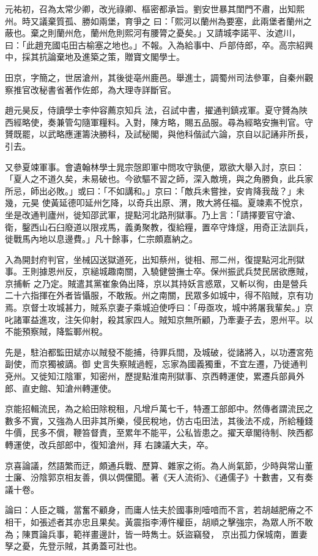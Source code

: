 \begin{pinyinscope}
 元祐初，召為太常少卿，改光祿卿、樞密都承旨。劉安世暴其閨門不肅，出知熙州。時又議棄質孤、勝如兩堡，育爭之
 曰：「熙河以蘭州為要塞，此兩堡者蘭州之蔽也。棄之則蘭州危，蘭州危則熙河有腰膂之憂矣。」又請城李諾平、汝遮川，曰：「此趙充國屯田古榆塞之地也。」不報。入為給事中、戶部侍郎，卒。高宗紹興中，採其抗論棄地及進築之策，贈寶文閣學士。



 田京，字簡之，世居滄州，其後徙亳州鹿邑。舉進士，調蜀州司法參軍，自秦州觀察推官改秘書省著作佐郎，為大理寺詳斷官。



 趙元昊反，侍讀學士李仲容薦京知兵
 法，召試中書，擢通判鎮戎軍。夏守贇為陜西經略使，奏兼管勾隨軍糧料。入對，陳方略，賜五品服。尋為經略安撫判官。守贇既罷，以武略應運籌決勝科，及試秘閣，與他科偕試六論，京自以記誦非所長，引去。



 又參夏竦軍事。會遺翰林學士晁宗愨即軍中問攻守孰便，眾欲大舉入討，京曰：「夏人之不道久矣，未易破也。今欲驅不習之師，深入敵境，與之角勝負，此兵家所忌，師出必敗。」或曰：「不如講和。」京曰：「敵兵未嘗挫，安肯降我哉？」未幾，元昊
 使黃延德叩延州乞降，以奇兵出原、渭，敗大將任福。夏竦素不悅京，坐是改通判廬州，徙知邵武軍，提點河北路刑獄事。乃上言：「請擇要官守滄、衛，鑿西山石臼廢道以限戎馬，義勇聚教，復給糧，置卒守烽燧，用奇正法訓兵，徙戰馬內地以息邊費。」凡十餘事，仁宗頗嘉納之。



 入為開封府判官，坐械囚送獄道死，出知蔡州，徙相、邢二州，復提點河北刑獄事。王則據恩州反，京縋城趣南關，入驍健營撫士卒。保州振武兵焚民居欲應賊，京捕斬
 之乃定。賊遣其黨崔象偽出降，京以其持妖言惑眾，又斬以徇，由是營兵二十六指揮在外者皆懾服，不敢叛。州之南關，民眾多如城中，得不陷賊，京有功焉。京督士攻城甚力，賊系京妻子乘城迫使呼曰：「毋亟攻，城中將屠我輩矣。」京叱諸軍益進攻，注矢仰射，殺其家四人。賊知京無所顧，乃牽妻子去，恩州平。以不能預察賊，降監鄆州稅。



 先是，駐泊都監田斌亦以賊發不能捕，待罪兵間，及城破，從諸將入，以功遷宮苑副使，而京獨被謫。御
 史言失察賊過輕，忘家為國義獨重，不宜左遷，乃徙通判兗州。又徙知江陰軍，知密州，歷提點淮南刑獄事、京西轉運使，累遷兵部員外郎、直史館、知滄州轉運使。



 京能招輯流民，為之給田除稅租，凡增戶萬七千，特遷工部郎中。然傳者謂流民之數多不實，又強為人田非其所樂，侵民稅地，仿古屯田法，其後法不成，所給種錢牛價，民多不償，鞭笞督責，至累年不能平，公私皆患之。擢天章閣待制、陜西都轉運使，改兵部郎中，復知滄州，拜
 右諫議大夫，卒。



 京喜論議，然語繁而迂，頗通兵戰、歷算、雜家之術。為人尚氣節，少時與常山董士廉、汾陰郭京相友善，俱以倜儻聞。著《天人流術》、《通儒子》十數書，又有奏議十卷。



 論曰：人臣之職，當奮不顧身，而庸人怯夫於國事則噎喑而不言，若胡越肥瘠之不相干，如張述者其亦忠且果矣。黃震指李溥忤權臣，胡順之擊強宗，為眾人所不敢為；陳貫論兵事，範祥畫邊計，皆一時雋士。妖盜竊發，
 京出孤力保城南，置妻孥之憂，先登示賊，其勇蓋可壯也。



\end{pinyinscope}
